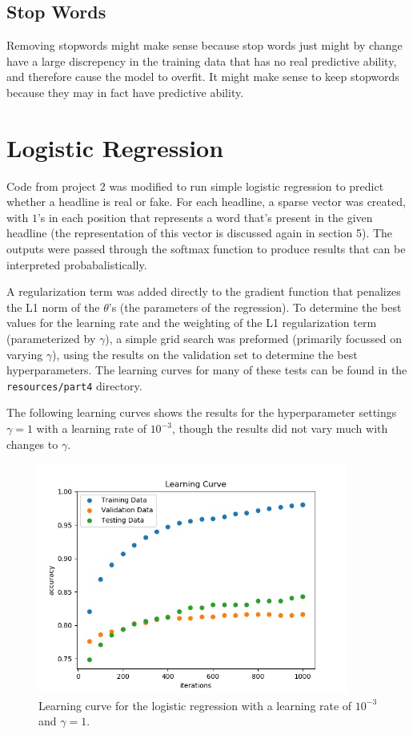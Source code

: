 \documentclass{article}
\begin{document}
   \subsection{Stop Words}
   Removing stopwords might make sense because stop words just might by change have a large discrepency in the
   training data that has no real predictive ability, and therefore cause the model to overfit. It might make
   sense to keep stopwords because they may in fact have predictive ability.


   \section{Logistic Regression}
   Code from project 2 was modified to run simple logistic regression to predict whether a headline is real
   or fake. For each headline, a sparse vector was created, with $1$'s in each position that represents a word
   that's present in the given headline (the representation of this vector is discussed again in section 5).
   The outputs were passed through the softmax function to produce results that can be interpreted probabalistically.

   A regularization term was added directly to the gradient function that penalizes the L1 norm of the
   $\theta$'s (the parameters of the regression).
   To determine the best values for the learning rate and the weighting of the L1 regularization term (parameterized
   by $\gamma$), a simple grid search was preformed (primarily focussed on varying $\gamma$), using the results on
   the validation set to determine the best hyperparameters. The learning curves for many of these tests can be
   found in the \texttt{resources/part4} directory.

   The following learning curves shows the results for the hyperparameter settings $\gamma = 1$ with a learning
   rate of $10^{-3}$, though the results did not vary much with changes to $\gamma$.
   \begin{figure}[h] \centering
      \includegraphics[width=4in]{resources/part4}
      \caption{ Learning curve for the logistic regression with a learning rate of $10^{-3}$ and
            $\gamma = 1$.}
   \end{figure}
\end{document}
